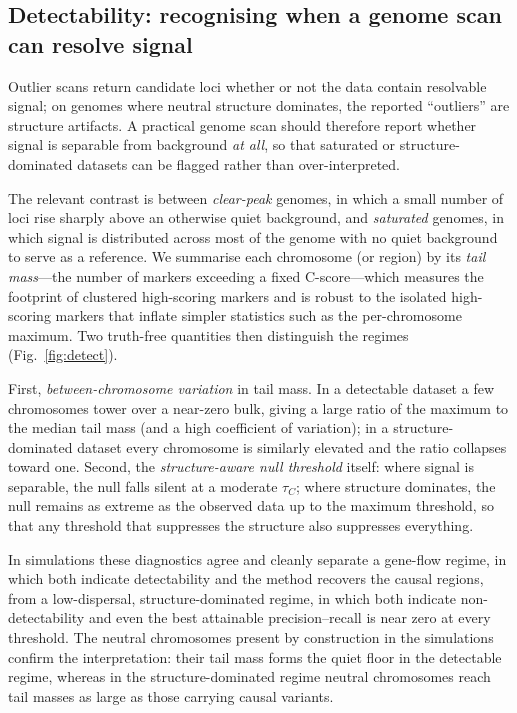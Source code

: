 \documentclass[11pt]{article}
\newcommand{\tauc}{\ensuremath{\tau_C}}
\begin{document}
\subsection{Detectability: recognising when a genome scan can resolve signal}
\label{sec:detect}

Outlier scans return candidate loci whether or not the data contain resolvable
signal; on genomes where neutral structure dominates, the reported ``outliers''
are structure artifacts. A practical genome scan should therefore report whether
signal is separable from background \emph{at all}, so that saturated or
structure-dominated datasets can be flagged rather than over-interpreted.

The relevant contrast is between \emph{clear-peak} genomes, in which a small
number of loci rise sharply above an otherwise quiet background, and
\emph{saturated} genomes, in which signal is distributed across most of the
genome with no quiet background to serve as a reference. We summarise each
chromosome (or region) by its \emph{tail mass}---the number of markers exceeding
a fixed C-score---which measures the footprint of clustered high-scoring markers
and is robust to the isolated high-scoring markers that inflate simpler
statistics such as the per-chromosome maximum. Two truth-free quantities then
distinguish the regimes (Fig.~\ref{fig:detect}).

First, \emph{between-chromosome variation} in tail mass. In a detectable dataset
a few chromosomes tower over a near-zero bulk, giving a large ratio of the
maximum to the median tail mass (and a high coefficient of variation); in a
structure-dominated dataset every chromosome is similarly elevated and the ratio
collapses toward one. Second, the \emph{structure-aware null threshold} itself:
where signal is separable, the null falls silent at a moderate \tauc; where
structure dominates, the null remains as extreme as the observed data up to the
maximum threshold, so that any threshold that suppresses the structure also
suppresses everything.

In simulations these diagnostics agree and cleanly separate a gene-flow regime,
in which both indicate detectability and the method recovers the causal regions,
from a low-dispersal, structure-dominated regime, in which both indicate
non-detectability and even the best attainable precision--recall is near zero at
every threshold. The neutral chromosomes present by construction in the
simulations confirm the interpretation: their tail mass forms the quiet floor in
the detectable regime, whereas in the structure-dominated regime neutral
chromosomes reach tail masses as large as those carrying causal variants.
\end{document}
